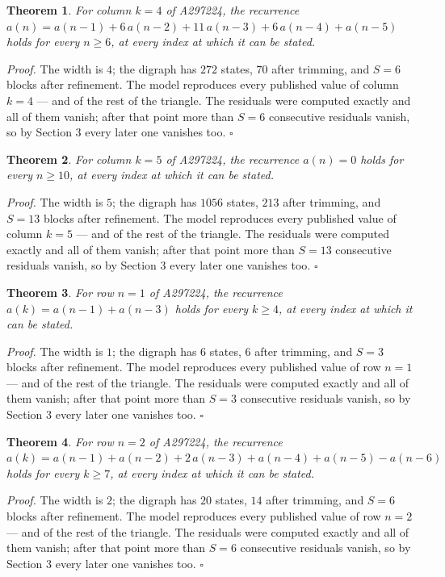 \documentclass[11pt]{article}
\newtheorem{theorem}{Theorem}
\theoremstyle{definition}
\begin{document}
\begin{theorem} For column $k = 4$ of A297224, the recurrence $a(n) = a(n-1) + 6\,a(n-2) + 11\,a(n-3) + 6\,a(n-4) + a(n-5)$ holds for every $n \ge 6$, at every index at which it can be stated.\end{theorem}

{\itshape Proof.} The width is $4$; the digraph has $272$ states, $70$ after trimming, and $S = 6$ blocks after refinement. The model reproduces every published value of column $k = 4$ --- and of the rest of the triangle. The residuals were computed exactly and all of them vanish; after that point more than $S = 6$ consecutive residuals vanish, so by Section 3 every later one vanishes too. $\square$

\begin{theorem} For column $k = 5$ of A297224, the recurrence $a(n) = 0$ holds for every $n \ge 10$, at every index at which it can be stated.\end{theorem}

{\itshape Proof.} The width is $5$; the digraph has $1056$ states, $213$ after trimming, and $S = 13$ blocks after refinement. The model reproduces every published value of column $k = 5$ --- and of the rest of the triangle. The residuals were computed exactly and all of them vanish; after that point more than $S = 13$ consecutive residuals vanish, so by Section 3 every later one vanishes too. $\square$

\begin{theorem} For row $n = 1$ of A297224, the recurrence $a(k) = a(n-1) + a(n-3)$ holds for every $k \ge 4$, at every index at which it can be stated.\end{theorem}

{\itshape Proof.} The width is $1$; the digraph has $6$ states, $6$ after trimming, and $S = 3$ blocks after refinement. The model reproduces every published value of row $n = 1$ --- and of the rest of the triangle. The residuals were computed exactly and all of them vanish; after that point more than $S = 3$ consecutive residuals vanish, so by Section 3 every later one vanishes too. $\square$

\begin{theorem} For row $n = 2$ of A297224, the recurrence $a(k) = a(n-1) + a(n-2) + 2\,a(n-3) + a(n-4) + a(n-5) - a(n-6)$ holds for every $k \ge 7$, at every index at which it can be stated.\end{theorem}

{\itshape Proof.} The width is $2$; the digraph has $20$ states, $14$ after trimming, and $S = 6$ blocks after refinement. The model reproduces every published value of row $n = 2$ --- and of the rest of the triangle. The residuals were computed exactly and all of them vanish; after that point more than $S = 6$ consecutive residuals vanish, so by Section 3 every later one vanishes too. $\square$
\end{document}

